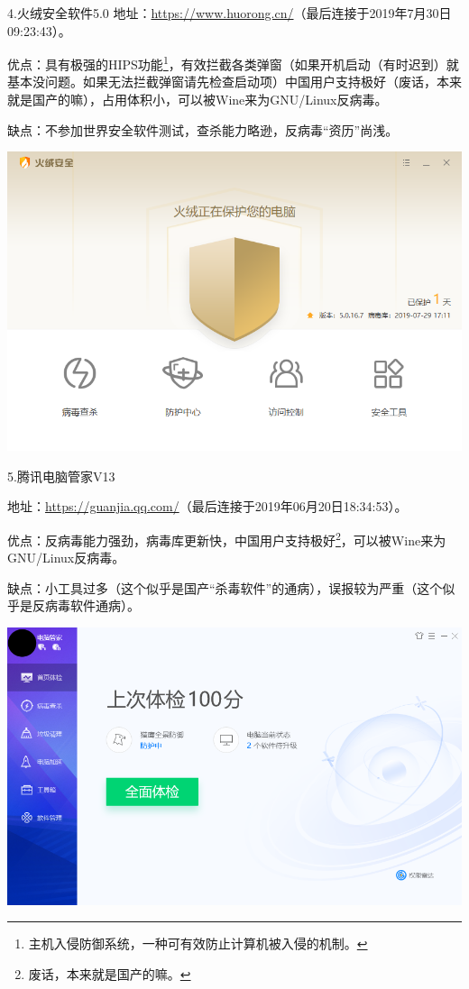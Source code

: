4.火绒安全软件5.0
地址：\url{https://www.huorong.cn/}（最后连接于2019年7月30日09:23:43）。\par
优点：具有极强的HIPS功能\footnote{主机入侵防御系统，一种可有效防止计算机被入侵的机制。}，有效拦截各类弹窗（如果开机启动（有时迟到）就基本没问题。如果无法拦截弹窗请先检查启动项）中国用户支持极好（废话，本来就是国产的嘛），占用体积小，可以被Wine来为GNU/Linux反病毒。\par
缺点：不参加世界安全软件测试，查杀能力略逊，反病毒“资历”尚浅。
\begin{center}
	\includegraphics[scale=0.6]{pic/huorong}
\end{center} \par
5.腾讯电脑管家V13\par
地址：\url{https://guanjia.qq.com/}（最后连接于2019年06月20日18:34:53）。\par
优点：反病毒能力强劲，病毒库更新快，中国用户支持极好\footnote{废话，本来就是国产的嘛。}，可以被Wine来为GNU/Linux反病毒。\par
缺点：小工具过多（这个似乎是国产“杀毒软件”的通病），误报较为严重（这个似乎是反病毒软件通病）。
\begin{center}
	\includegraphics[scale=0.5]{pic/tsav}
\end{center} \par
